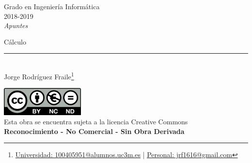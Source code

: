 \documentclass[12pt]{report} %
\begin{document}
	
\begin{titlepage}
	\begin{sffamily}
	\color{azulUC3M}
	\begin{center}
		\begin{figure}[H] %
		\end{figure}
		\vspace{2.5cm}
		\begin{Large}
			Grado en Ingeniería Informática\\			
			2018-2019\\
			\vspace{2cm}		
			\textsl{Apuntes}\\
			\bigskip
		\end{Large}
		 	{\Huge Cálculo}\\
		 	\vspace*{0.5cm}
	 		\rule{10.5cm}{0.1mm}\\
			\vspace*{0.9cm}
			{\LARGE Jorge Rodríguez Fraile\footnote{\href{mailto:100405951@alumnos.uc3m.es}{Universidad: 100405951@alumnos.uc3m.es}  |  \href{mailto:jrf1616@gmail.com}{Personal: jrf1616@gmail.com}}}\\ 
			\vspace*{1cm}
	\end{center}
	\vfill
	\color{black}
		\includegraphics[width=4.2cm]{img/creativecommons.png}\\
		Esta obra se encuentra sujeta a la licencia Creative Commons\\ \textbf{Reconocimiento - No Comercial - Sin Obra Derivada}
	\end{sffamily}
\end{titlepage}


\tableofcontents
\thispagestyle{fancy}
\end{document}

